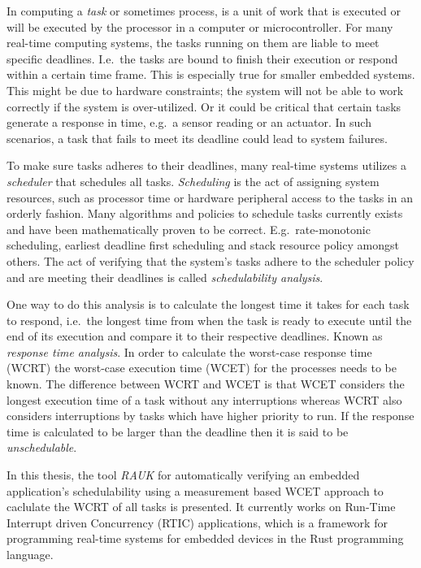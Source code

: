 In computing a \emph{task} or sometimes process, is a unit of work that is
executed or will be executed by the processor in a computer or microcontroller.
For many real-time computing systems, the tasks running on them are liable to
meet specific deadlines. I.e.\ the tasks are bound to finish their execution or
respond within a certain time frame. This is especially true for smaller
embedded systems. This might be due to hardware constraints; the system will
not be able to work correctly if the system is over-utilized. Or it could be
critical that certain tasks generate a response in time, e.g.\ a sensor reading
or an actuator. In such scenarios, a task that fails to meet its deadline could
lead to system failures.

To make sure tasks adheres to their deadlines, many real-time systems utilizes
a \emph{scheduler} that schedules all tasks. \emph{Scheduling} is the act of
assigning system resources, such as processor time or hardware peripheral
access to the tasks in an orderly fashion. Many algorithms and policies to
schedule tasks currently exists and have been mathematically proven to be
correct.  E.g.\ rate-monotonic scheduling\cite{ratemonotonic}, earliest
deadline first scheduling\cite{edf} and stack resource policy\cite{srp} amongst
others.  The act of verifying that the system's tasks adhere to the scheduler
policy and are meeting their deadlines is called \emph{schedulability
analysis}.

One way to do this analysis is to calculate the longest time it takes for each
task to respond, i.e.\ the longest time from when the task is ready to execute
until the end of its execution and compare it to their respective deadlines.
Known as \emph{response time analysis}. In order to calculate the worst-case
response time (WCRT) the worst-case execution time (WCET) for the processes
needs to be known. The difference between WCRT and WCET is that WCET considers
the longest execution time of a task without any interruptions whereas WCRT
also considers interruptions by tasks which have higher priority to
run\cite{hardrealtimecomputingsystems}. If the response time is calculated to
be larger than the deadline then it is said to be \emph{unschedulable}.

In this thesis, the tool \emph{RAUK} for automatically verifying an embedded
application's schedulability using a measurement based WCET approach to
caclulate the WCRT of all tasks is presented. It currently works on
Run-Time Interrupt driven Concurrency (RTIC) applications, which is a framework
for programming real-time systems for embedded devices in the Rust programming
language.

